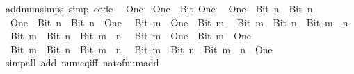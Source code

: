 \begin{isabellebody}
\isanewline
%
\endisadelimproof
\isanewline
{}\isamarkupfalse%
\ add{\isacharunderscore}{\kern0pt}num{\isacharunderscore}{\kern0pt}simps\ {\isacharbrackleft}{\kern0pt}simp{\isacharcomma}{\kern0pt}\ code{\isacharbrackright}{\kern0pt}{\isacharcolon}{\kern0pt}\isanewline
\ \ {\isachardoublequoteopen}One\ {\isacharplus}{\kern0pt}\ One\ {\isacharequal}{\kern0pt}\ Bit{}\ One{\isachardoublequoteclose}\isanewline
\ \ {\isachardoublequoteopen}One\ {\isacharplus}{\kern0pt}\ Bit{}\ n\ {\isacharequal}{\kern0pt}\ Bit{}\ n{\isachardoublequoteclose}\isanewline
\ \ {\isachardoublequoteopen}One\ {\isacharplus}{\kern0pt}\ Bit{}\ n\ {\isacharequal}{\kern0pt}\ Bit{}\ {\isacharparenleft}{\kern0pt}n\ {\isacharplus}{\kern0pt}\ One{\isacharparenright}{\kern0pt}{\isachardoublequoteclose}\isanewline
\ \ {\isachardoublequoteopen}Bit{}\ m\ {\isacharplus}{\kern0pt}\ One\ {\isacharequal}{\kern0pt}\ Bit{}\ m{\isachardoublequoteclose}\isanewline
\ \ {\isachardoublequoteopen}Bit{}\ m\ {\isacharplus}{\kern0pt}\ Bit{}\ n\ {\isacharequal}{\kern0pt}\ Bit{}\ {\isacharparenleft}{\kern0pt}m\ {\isacharplus}{\kern0pt}\ n{\isacharparenright}{\kern0pt}{\isachardoublequoteclose}\isanewline
\ \ {\isachardoublequoteopen}Bit{}\ m\ {\isacharplus}{\kern0pt}\ Bit{}\ n\ {\isacharequal}{\kern0pt}\ Bit{}\ {\isacharparenleft}{\kern0pt}m\ {\isacharplus}{\kern0pt}\ n{\isacharparenright}{\kern0pt}{\isachardoublequoteclose}\isanewline
\ \ {\isachardoublequoteopen}Bit{}\ m\ {\isacharplus}{\kern0pt}\ One\ {\isacharequal}{\kern0pt}\ Bit{}\ {\isacharparenleft}{\kern0pt}m\ {\isacharplus}{\kern0pt}\ One{\isacharparenright}{\kern0pt}{\isachardoublequoteclose}\isanewline
\ \ {\isachardoublequoteopen}Bit{}\ m\ {\isacharplus}{\kern0pt}\ Bit{}\ n\ {\isacharequal}{\kern0pt}\ Bit{}\ {\isacharparenleft}{\kern0pt}m\ {\isacharplus}{\kern0pt}\ n{\isacharparenright}{\kern0pt}{\isachardoublequoteclose}\isanewline
\ \ {\isachardoublequoteopen}Bit{}\ m\ {\isacharplus}{\kern0pt}\ Bit{}\ n\ {\isacharequal}{\kern0pt}\ Bit{}\ {\isacharparenleft}{\kern0pt}m\ {\isacharplus}{\kern0pt}\ n\ {\isacharplus}{\kern0pt}\ One{\isacharparenright}{\kern0pt}{\isachardoublequoteclose}\isanewline
%
\isadelimproof
\ \ %
\endisadelimproof
%
\isatagproof
{}\isamarkupfalse%
\ {\isacharparenleft}{\kern0pt}simp{\isacharunderscore}{\kern0pt}all\ add{\isacharcolon}{\kern0pt}\ num{\isacharunderscore}{\kern0pt}eq{\isacharunderscore}{\kern0pt}iff\ nat{\isacharunderscore}{\kern0pt}of{\isacharunderscore}{\kern0pt}num{\isacharunderscore}{\kern0pt}add{\isacharparenright}{\kern0pt}%

\end{isabellebody}
